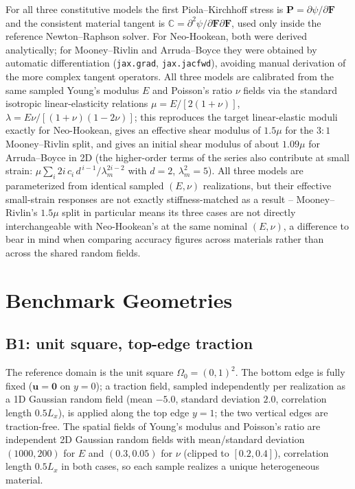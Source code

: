 \documentclass[final,5p,times]{elsarticle}
\begin{document}
For all three constitutive models the first Piola--Kirchhoff stress is
$\mathbf{P} = \partial\psi/\partial\mathbf{F}$ and the consistent material
tangent is $\mathbb{C} = \partial^2\psi/\partial\mathbf{F}\partial\mathbf{F}$,
used only inside the reference Newton\mbox{--}Raphson solver. For Neo-Hookean, both
were derived analytically; for Mooney--Rivlin and Arruda--Boyce they were
obtained by automatic differentiation (\texttt{jax.grad}, \texttt{jax.jacfwd}),
avoiding manual derivation of the more complex tangent operators. All three
models are calibrated from the same sampled Young's modulus $E$ and
Poisson's ratio $\nu$ fields via the standard isotropic linear-elasticity
relations $\mu = E/[2(1+\nu)]$, $\lambda = E\nu/[(1+\nu)(1-2\nu)]$; this
reproduces the target linear-elastic moduli exactly for Neo-Hookean, gives an
effective shear modulus of $1.5\mu$ for the $3{:}1$ Mooney--Rivlin split, and
gives an initial shear modulus of about $1.09\mu$ for Arruda--Boyce in
2D (the higher-order terms of the series also contribute at small
strain: $\mu\sum_i 2i\,c_i\,d^{\,i-1}/\lambda_m^{2i-2}$ with $d{=}2$,
$\lambda_m^2{=}5$). All three models are
parameterized from identical sampled $(E,\nu)$ realizations, but their
effective small-strain responses are not exactly stiffness-matched as a
result -- Mooney--Rivlin's $1.5\mu$ split in particular means its three
cases are not directly interchangeable with Neo-Hookean's at the same
nominal $(E,\nu)$, a difference to bear in mind when comparing accuracy
figures across materials rather than across the shared random fields.

\FloatBarrier
\section{Benchmark Geometries}
\label{sec:geometries}

\subsection{B1: unit square, top-edge traction}
The reference domain is the unit square $\Omega_0=(0,1)^2$. The bottom edge
is fully fixed ($\mathbf{u}=\mathbf{0}$ on $y=0$); a traction field,
sampled independently per realization as a 1D Gaussian random field
(mean $-5.0$, standard deviation $2.0$, correlation length $0.5L_x$), is
applied along the top edge $y=1$; the two vertical edges are traction-free.
The spatial fields of Young's modulus and Poisson's ratio are independent 2D
Gaussian random fields with mean/standard deviation $(1000,200)$ for $E$ and
$(0.3,0.05)$ for $\nu$ (clipped to $[0.2,0.4]$), correlation length $0.5L_x$
in both cases, so each sample realizes a unique heterogeneous material.
\end{document}
